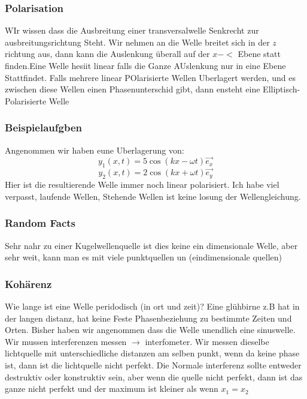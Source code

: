 \documentclass{article}
\begin{document}
\subsubsection{Polarisation} WIr wissen dass die Ausbreitung einer transversalwelle Senkrecht zur ausbreitungsrichtung Steht. Wir nehmen an die Welle breitet sich in der $z$ richtung aus, dann kann die Auslenkung überall auf der $x-<$ Ebene statt finden.\newline Eine Welle hesiit linear falls die Ganze AUslenkung nur in eine Ebene Stattfindet.
Falls mehrere linear POlarisierte Wellen Uberlagert werden, und es zwischen diese Wellen einen Phasenunterschid gibt, dann ensteht eine Elliptisch-Polarisierte Welle
\newline\subsubsection{Beispielaufgben} Angenommen wir haben eune Uberlagerung von:\[y_1(x,t)=5\cos(kx-\omega t)\vec{e_x}\]
\[y_2(x,t)=2\cos(kx+\omega t)\vec{e_y}\]Hier ist die resultierende Welle immer noch linear polarisiert.
Ich habe viel verpasst, laufende Wellen, Stehende Wellen ist keine losung der Wellengleichung.
\newline 
    \subsubsection{Random Facts}
    Sehr nahr zu einer Kugelwellenquelle ist dies keine ein dimensionale Welle, aber sehr weit, kann man es mit viele punktquellen un (eindimensionale quellen)
    \newline
\subsubsection{Kohärenz}
Wie lange ist eine Welle peridodisch (in ort und zeit)?
Eine glühbirne z.B hat in der langen distanz, hat keine Feste Phasenbeziehung zu bestimmte Zeiten und Orten.
Bisher haben wir angenommen dass die Welle unendlich eine sinuswelle.
\newline
Wir mussen interferenzen messen $\rightarrow$ interfometer. Wir messen dieselbe lichtquelle mit unterschiedliche distanzen am selben punkt, wenn da keine phase ist, dann ist die lichtquelle nicht perfekt.
Die Normale interferenz sollte entweder destruktiv oder konstruktiv sein, aber wenn die quelle nicht perfekt, dann ist das ganze nicht perfekt und der maximum ist kleiner als wenn $x_1=x_2$
\end{document}
